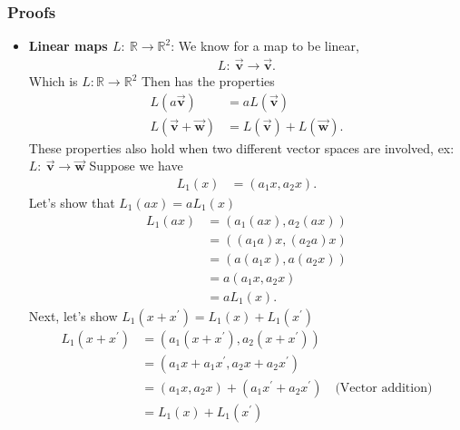 \documentclass{report}
\begin{document}
    \subsubsection{Proofs}
    \begin{itemize}
        \item \textbf{Linear maps $L:\ \mathbb{R} \to \mathbb{R}^{2}$}: 
            We know for a map to be linear,
            \begin{align*}
                L:\ \vec{\mathbf{v}} \to \vec{\mathbf{v}}
            .\end{align*}
            \bigbreak \noindent 
            Which is $L: \mathbb{R} \to \mathbb{R}^{2} $
            \bigbreak \noindent 
            Then has the properties
            \begin{align*}
                L(a\vec{\mathbf{v}}) &= aL(\vec{\mathbf{v}}) \\
                L(\vec{\mathbf{v}} + \vec{\mathbf{w}}) &= L(\vec{\mathbf{v}}) + L(\vec{\mathbf{w}})
            .\end{align*}
            These properties also hold when two different vector spaces are involved, ex: $L:\ \vec{\mathbf{v}} \to \vec{\mathbf{w}} $
            \bigbreak \noindent 
            Suppose we have
            \begin{align*}
                L_{1}(x) &= (a_{1}x, a_{2}x)
            .\end{align*}
            Let's show that $L_{1}(ax) = aL_{1}(x)$
            \begin{align*}
                L_{1}(ax) &= (a_{1}(ax), a_{2}(ax)) \\
                &=((a_{1}a)x, (a_{2}a)x) \\
                &=(a(a_{1}x), a(a_{2}x)) \\
                &=a(a_{1}x,a_{2}x) \\
                &=aL_{1}(x)
            .\end{align*}
            \bigbreak \noindent 
            Next, let's show $L_{1}(x + x^{\prime}) = L_{1}(x) + L_{1}(x^{\prime})$
            \begin{align*}
                L_{1}(x + x^{\prime}) &= (a_{1}(x+x^{\prime}), a_{2}(x + x^{\prime})) \\
                &=(a_{1}x + a_{1}x^{\prime}, a_{2}x + a_{2}x^{\prime}) \\
                &=(a_{1}x,a_{2}x) + (a_{1}x^{\prime} + a_{2}x^{\prime}) \quad \text{(Vector addition)} \\
                &=L_{1}(x) + L_{1}(x^{\prime})

\end{align*}
\end{itemize}
\end{document}
